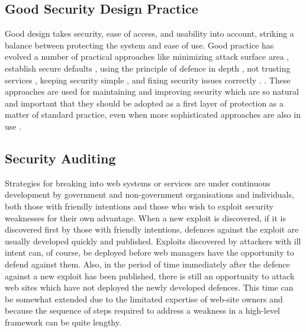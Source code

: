 


\subsection{Good Security Design Practice}
Good design takes security, ease of access, and usability into account,
striking a balance between protecting the system and ease of use. Good
practice has evolved a number of practical approaches like  minimizing
attack surface area \cite{bhardwaj2018reducing},  establish secure
defaults \cite{lai2018impact}, using the principle of defence in depth
\cite{toch2018privacy}, not trusting services \cite{ghirardello2018cyber},
keeping security simple \cite{thomsen2018network}, and fixing security
issues correctly \iflonger\cite {ali2018security, tabassum2018evaluating}.
\else \cite {tabassum2018evaluating}.\fi
 These approaches  are used for  maintaining and improving security which
are so natural and important that they should be adopted as a first
layer of protection as a matter of standard practice, even when more
sophisticated approaches are also in use \cite {ross2018systems}.


\subsection{Security Auditing}\label{audit}

Strategies for breaking into web systems or services are under continuous
development by government and non-government organisations and individuals,
both those with friendly intentions and those who wish to exploit security
weaknesses for their own advantage. When
a new exploit is discovered, if it is discovered first by those with 
friendly intentions, defences against the exploit are usually developed
quickly and published. Exploits discovered by attackers with ill intent
can, of course, be deployed before web managers have the opportunity
to defend against them. Also, in the period of time immediately after
the defence against a new exploit has been published, there is still
an opportunity to attack web sites which have not deployed the newly developed
defences. This time can be somewhat extended due to the limitated expertise
of web-site owners and because the sequence of steps required to address a weakness
in a high-level framework can be quite lengthy.

